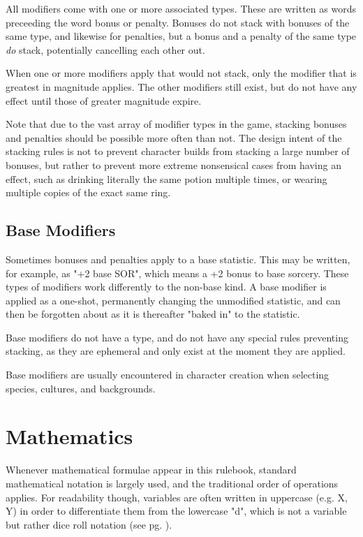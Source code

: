\begin{multicols*}{2}
    All modifiers come with one or more associated types. These are written as
    words preceeding the word bonus or penalty. Bonuses do not stack with bonuses
    of the same type, and likewise for penalties, but a bonus and a
    penalty of the same type \textit{do} stack, potentially cancelling each other
    out.
    
    When one or more modifiers apply that would not stack, only the modifier that
    is greatest in magnitude applies. The other modifiers still exist, but do not
    have any effect until those of greater magnitude expire.

    Note that due to the vast array of modifier types in the game, stacking bonuses
    and penalties should be possible more often than not. The design intent of the
    stacking rules is not to prevent character builds from stacking a large number
    of bonuses, but rather to prevent more extreme nonsensical cases from having
    an effect, such as drinking literally the same potion multiple times, or
    wearing multiple copies of the exact same ring.

    \subsection{Base Modifiers}\label{modifier}
    Sometimes bonuses and penalties apply to a base statistic. This may be written,
    for example, as "+2 base SOR", which means a +2 bonus to base sorcery. These
    types of modifiers work differently to the non-base kind. A base modifier
    is applied as a one-shot, permanently changing the unmodified statistic, and
    can then be forgotten about as it is thereafter "baked in" to the statistic.

    Base modifiers do not have a type, and do not have any special rules preventing
    stacking, as they are ephemeral and only exist at the moment they are applied.

    Base modifiers are usually encountered in character creation when selecting
    species, cultures, and backgrounds.

    \section{Mathematics}
    Whenever mathematical formulae appear in this rulebook, standard
    mathematical notation is largely used, and the traditional order of
    operations applies. For readability though, variables are often written
    in uppercase (e.g. X, Y) in order to differentiate them from the lowercase
    "d", which is not a variable but rather dice roll notation (see pg.
    \pageref{dice}).


\end{multicols*}
